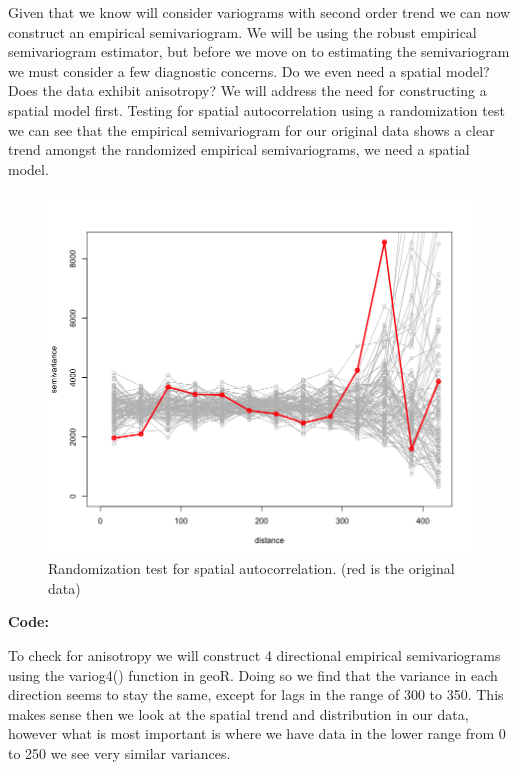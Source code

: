 \documentclass[12pt]{article}
\makeatletter
\theoremstyle{homework}
\newenvironment{exercise}[1]
{\def\@currentlabel{#1}\exercisecore}
{\endexercisecore}
\makeatother
\begin{document}
\begin{exercise}{2}
  Given that we know will consider variograms with second order trend we can now construct an empirical semivariogram. We will be using the robust empirical semivariogram estimator, but before we move on 
  to estimating the semivariogram we must consider a few diagnostic concerns. Do we even need a spatial model? Does the data exhibit anisotropy? We will address the need for constructing a spatial model first. 
  Testing for spatial autocorrelation using a randomization test we can see that the empirical semivariogram for our original data shows a clear trend amongst the randomized empirical semivariograms, we need 
  a spatial model. 
  
  \begin{figure}[H]
    \begin{center}
      \caption{Randomization test for spatial autocorrelation. (red is the original data)}
    \includegraphics[width = .75\textwidth]{Rplot02.png}
    \end{center}
  \end{figure}
  \textbf{Code:}
  \begin{center}
  
  \end{center}
  To check for anisotropy we will construct 4 directional empirical semivariograms using the variog4() function in geoR. Doing so we find that the variance in each direction 
  seems to stay the same, except for lags in the range of 300 to 350. This makes sense then we look at the spatial trend and distribution in our data, however what is most important is 
  where we have data in the lower range from 0 to 250 we see very similar variances. 


\end{exercise}
\end{document}
